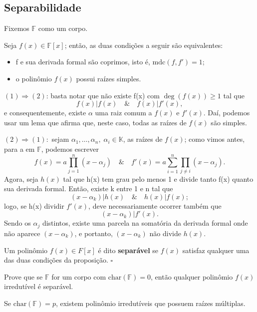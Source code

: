\documentclass[../algebraIII_notes.tex]{subfiles}
\begin{document}
\subsection{Separabilidade}
Fixemos \(\mathbb{F}\) como um corpo.
\begin{prop*}
	Seja \(f(x)\in \mathbb{F}[x]\); então, as duas condições a seguir são equivalentes:
	\begin{itemize}
		\item[1)] f e sua derivada formal são coprimos, isto é, \(\mathrm{mdc}(f, f') = 1\);
		\item[2)] o polinômio \(f(x)\) possui raízes simples.
	\end{itemize}

\end{prop*}
\begin{proof*}
	\((1)\Rightarrow (2)\): basta notar que não existe f(x) com \(\deg{(f(x))}\geq 1\) tal que
	\[
		f(x)|f(x) \quad\&\quad f(x)|f'(x),
	\]
	e consequentemente, existe \(\alpha \) uma raiz comum a \(f(x)\) e \(f'(x)\). Daí, podemos usar um lema que afirma que, neste caso, todas as raízes de \(f(x)\) são simples.

	\((2)\Rightarrow (1):\) sejam \(\alpha_1, \dotsc , \alpha_{n},\; \alpha_{i}\in \mathbb{K}\), as raízes de \(f(x)\); como vimos antes, para a em \(\mathbb{F}\), podemos escrever
	\[
		f(x) = a \prod\limits_{j=1}^{n}(x-\alpha_{j}) \quad\&\quad f'(x) = a \sum\limits_{i=1}^{n}\prod\limits_{j\neq i}^{}(x-\alpha_{j}).
	\]
	Agora, seja \(h(x)\) tal que h(x) tem grau pelo menos 1 e divide tanto f(x) quanto sua derivada formal. Então, existe k entre 1 e n tal que
	\[
		(x-\alpha_{k})|h(x) \quad\&\quad h(x)|f(x);
	\]
	logo, se h(x) dividir \(f'(x)\), deve necessariamente ocorrer também que
	\[
		(x-\alpha_{k})|f'(x).
	\]
	Sendo os \(\alpha_{j}\) distintos, existe uma parcela na somatória da derivada formal onde não aparece \((x-\alpha_{k})\), e portanto, \((x-\alpha_{k})\) não divide \(h(x)\). \qedsymbol
\end{proof*}
\begin{def*}
	Um polinômio \(f(x)\in F[x]\) é dito \textbf{separável} se \(f(x)\) satisfaz qualquer uma das duas condições da proposição. \(\square\)
\end{def*}

\begin{exr}
	Prove que se \(\mathbb{F}\) for um corpo com \(\mathrm{char}(\mathbb{F}) = 0\), então qualquer polinômio \(f(x)\) irredutível é separável.
\end{exr}
\begin{example}
	Se \(\mathrm{char}(\mathbb{F}) =p\), existem polinômio irredutíveis que possuem raízes múltiplas.
\end{example}
\end{document}
